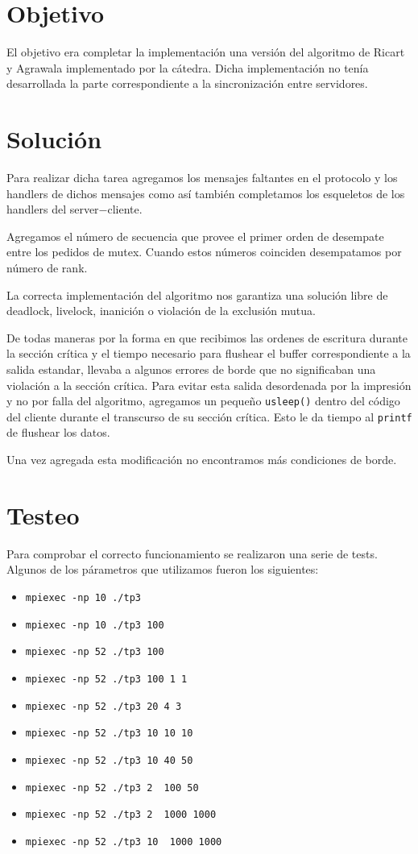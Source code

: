 \section{Objetivo}
El objetivo era completar la implementaci\'on una versi\'on del algoritmo de Ricart y Agrawala implementado por la c\'atedra. Dicha implementaci\'on no ten\'ia desarrollada la parte correspondiente a la sincronizaci\'on entre servidores.

\section{Soluci\'on}

Para realizar dicha tarea agregamos los mensajes faltantes en el protocolo y los handlers de dichos mensajes como as\'i tambi\'en completamos los esqueletos de los handlers del server$-$cliente. 

Agregamos el n\'umero de secuencia que provee el primer orden de desempate entre los pedidos de mutex. Cuando estos n\'umeros coinciden desempatamos por n\'umero de rank.

La correcta implementaci\'on del algoritmo nos garantiza una soluci\'on libre de deadlock, livelock, inanici\'on o violaci\'on de la exclusi\'on mutua. 

De todas maneras por la forma en que recibimos las ordenes de escritura durante la secci\'on cr\'itica y el tiempo necesario para flushear el buffer correspondiente a la salida estandar, llevaba a algunos errores de borde que no significaban una violaci\'on a la secci\'on cr\'itica. Para evitar esta salida desordenada por la impresi\'on y no por falla del algoritmo, agregamos un peque\~no \verb|usleep()| dentro del c\'odigo del cliente durante el transcurso de su secci\'on cr\'itica. Esto le da tiempo al \verb|printf| de flushear los datos. 

Una vez agregada esta modificaci\'on no encontramos m\'as condiciones de borde.

\section{Testeo}

Para comprobar el correcto funcionamiento se realizaron una serie de tests. Algunos de los p\'arametros que utilizamos fueron los siguientes:
\begin{itemize}
\item \verb|mpiexec -np 10 ./tp3|
\item \verb|mpiexec -np 10 ./tp3 100|
\item \verb|mpiexec -np 52 ./tp3 100|
\item \verb|mpiexec -np 52 ./tp3 100 1 1|
\item \verb|mpiexec -np 52 ./tp3 20 4 3|
\item \verb|mpiexec -np 52 ./tp3 10 10 10|
\item \verb|mpiexec -np 52 ./tp3 10 40 50|
\item \verb|mpiexec -np 52 ./tp3 2  100 50|
\item \verb|mpiexec -np 52 ./tp3 2  1000 1000|
\item \verb|mpiexec -np 52 ./tp3 10  1000 1000|
\end{itemize}